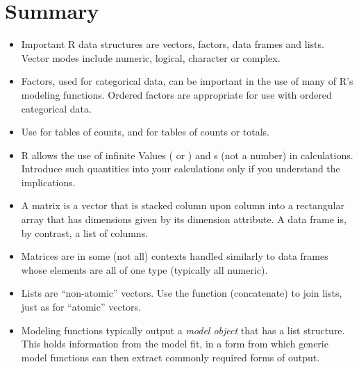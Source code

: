 \section{Summary}
\begin{itemize}
\item[] Important R data structures are vectors, factors, data frames and
  lists.  Vector modes include numeric, logical, character or complex.

\item[] Factors, used for categorical data, can be important in the use
  of many of R's modeling functions. Ordered factors are appropriate
for use with ordered categorical data.

\item[] Use  for tables of counts, and 
for tables of counts or totals.

\item[] R allows the use of infinite Values ( or
  ) and s (not a number) in calculations.
  Introduce such quantities into your calculations only if you
  understand the implications.

\item[] A matrix is a vector that is stacked column upon column into a
  rectangular array that has dimensions given by its dimension
  attribute.  A data frame is, by contrast, a list of columns.

\item[] 
Matrices are in some (not all) contexts handled similarly to data
  frames whose elements are all of one type (typically all numeric).

\item[] Lists are ``non-atomic'' vectors. Use the function
   (concatenate) to join lists, just as for ``atomic''
  vectors.

\item[] Modeling functions
 typically output a
\textit{model object} that has a list structure.  This holds
information from the model fit, in a form from which generic model
functions can then extract commonly required forms of output.

\end{itemize}

